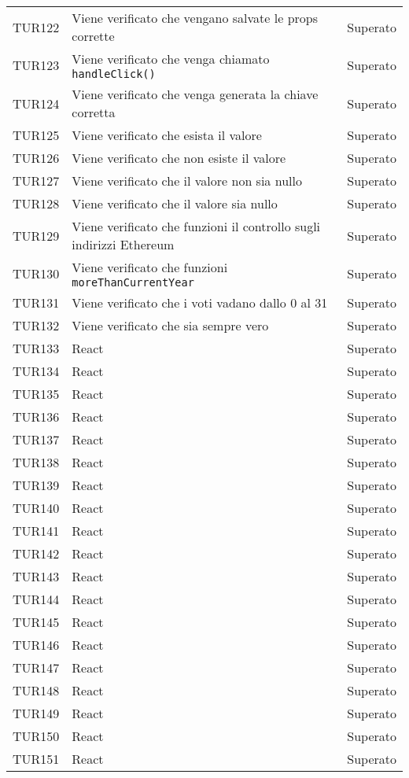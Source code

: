 \documentclass[PianoDiQualifica.tex]{subfiles}
\begin{document}
\begin{longtable}[H]{P{2cm}P{8.5cm}P{3cm}}
	TUR122 & Viene verificato che vengano salvate le props corrette & Superato \\ 
	TUR123 & Viene verificato che venga chiamato \texttt{handleClick()} & Superato \\ 
	TUR124 & Viene verificato che venga generata la chiave corretta & Superato \\ 
	TUR125 & Viene verificato che esista il valore & Superato \\ 
	TUR126 & Viene verificato che non esiste il valore & Superato \\ 
	TUR127 & Viene verificato che il valore non sia nullo & Superato \\ 
	TUR128 & Viene verificato che il valore sia nullo & Superato \\ 
	TUR129 & Viene verificato che funzioni il controllo sugli indirizzi Ethereum & Superato \\ 
	TUR130 & Viene verificato che funzioni \texttt{moreThanCurrentYear} & Superato \\ 
	TUR131 & Viene verificato che i voti vadano dallo 0 al 31 & Superato \\ 
	TUR132 & Viene verificato che sia sempre vero & Superato \\ 
	TUR133 & React & Superato \\ 
	TUR134 & React & Superato \\ 
	TUR135 & React & Superato \\ 
	TUR136 & React & Superato \\ 
	TUR137 & React & Superato \\ 
	TUR138 & React & Superato \\ 
	TUR139 & React & Superato \\ 
	TUR140 & React & Superato \\ 
	TUR141 & React & Superato \\ 
	TUR142 & React & Superato \\ 
	TUR143 & React & Superato \\ 
	TUR144 & React & Superato \\ 
	TUR145 & React & Superato \\ 
	TUR146 & React & Superato \\ 
	TUR147 & React & Superato \\ 
	TUR148 & React & Superato \\ 
	TUR149 & React & Superato \\ 
	TUR150 & React & Superato \\ 
	TUR151 & React & Superato \\ 

\end{longtable}
\end{document}
